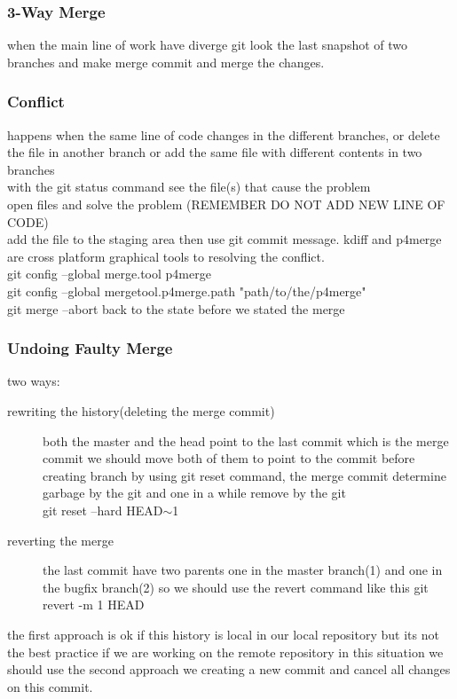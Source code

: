 \documentclass{article}
\begin{document}
		\subsubsection{3-Way Merge}
			when the main line of work have diverge git look the last snapshot of two branches and make merge commit and merge the changes.
			
			
		\subsubsection{Conflict}
			happens when the same line of code changes in the different branches, or delete the file in another branch or add the same file
			with different contents in two branches\\
			with the git status command see the file(s) that cause the problem\\
			open files and solve the problem (REMEMBER DO NOT ADD NEW LINE OF CODE)\\
			add the file to the staging area then use git commit message.
			kdiff and p4merge are cross platform graphical tools to resolving the conflict.\\
			git config --global merge.tool p4merge\\
			git config --global mergetool.p4merge.path "path/to/the/p4merge"\\
			git merge --abort back to the state before we stated the merge\\
		\subsubsection{Undoing Faulty Merge}
			two ways:
			\begin{description}
				\item [rewriting the history(deleting the merge commit)]
					both the master and the head point to the last commit which is the merge commit we should move both of them to point to the commit before creating branch by using git reset command, the merge commit determine garbage by the git and one in a while remove by the git\\
					git reset --hard HEAD$\sim$1\\

				\item [reverting the merge] the last commit have two parents one in the master branch(1) and one in the bugfix branch(2) so we should use the revert command like this git revert -m 1 HEAD
			\end{description}
			the first approach is ok if this history is local in our local repository but its not the best practice if we are working on the remote repository in this situation we should use the second approach we creating a new commit and cancel all changes on this commit.
\end{document}
